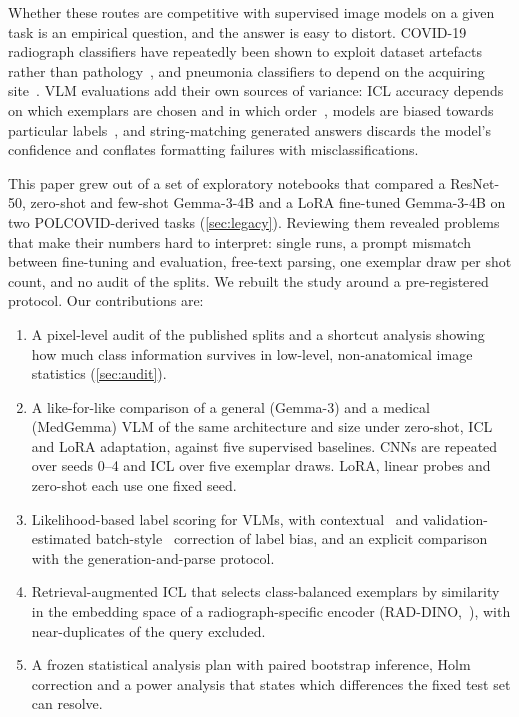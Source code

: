 \documentclass[11pt]{article}
\begin{document}
Whether these routes are competitive with supervised image models on a given task is an
empirical question, and the answer is easy to distort. COVID-19 radiograph classifiers have
repeatedly been shown to exploit dataset artefacts rather than pathology~\citep{degrave2021shortcuts,
roberts2021pitfalls}, and pneumonia classifiers to depend on the acquiring
site~\citep{zech2018variable}. VLM evaluations add their own sources of variance: ICL accuracy
depends on which exemplars are chosen and in which order~\citep{liu2022makes,lu2022fantastically},
models are biased towards particular labels~\citep{zhao2021calibrate,zhou2024batch}, and
string-matching generated answers discards the model's confidence and conflates formatting
failures with misclassifications.

This paper grew out of a set of exploratory notebooks that compared a ResNet-50, zero-shot and
few-shot Gemma-3-4B and a LoRA fine-tuned Gemma-3-4B on two POLCOVID-derived tasks
(\cref{sec:legacy}). Reviewing them revealed problems that make their numbers hard to interpret:
single runs, a prompt mismatch between fine-tuning and evaluation, free-text parsing, one
exemplar draw per shot count, and no audit of the splits. We rebuilt the study around a
pre-registered protocol. Our contributions are:
\begin{enumerate}
  \item A pixel-level audit of the published splits and a shortcut analysis showing how much
  class information survives in low-level, non-anatomical image statistics (\cref{sec:audit}).
  \item A like-for-like comparison of a general (Gemma-3) and a medical (MedGemma) VLM of the
  same architecture and size under zero-shot, ICL and LoRA adaptation, against five supervised
  baselines. CNNs are repeated over seeds 0--4 and ICL over five exemplar draws. LoRA, linear
  probes and zero-shot each use one fixed seed.
  \item Likelihood-based label scoring for VLMs, with contextual~\citep{zhao2021calibrate} and
  validation-estimated batch-style~\citep{zhou2024batch} correction of label bias, and an
  explicit comparison with the generation-and-parse protocol.
  \item Retrieval-augmented ICL that selects class-balanced exemplars by similarity in the
  embedding space of a radiograph-specific encoder (RAD-DINO,~\citealp{perezgarcia2025raddino}),
  with near-duplicates of the query excluded.
  \item A frozen statistical analysis plan with paired bootstrap inference, Holm correction and
  a power analysis that states which differences the fixed test set can resolve.
\end{enumerate}
\end{document}
